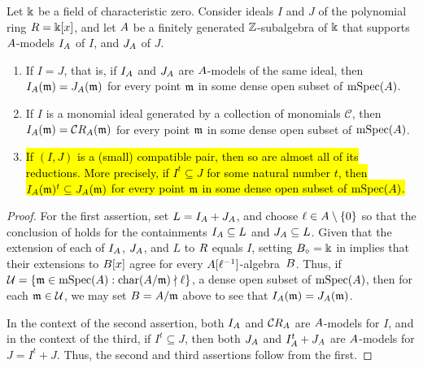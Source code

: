 \documentclass{amsart}
\begin{document}
\begin{corollary}
\label{reduction basics: C}
Let $\Bbbk$ be a field of characteristic zero.  Consider ideals  $I$ and $J$ of the polynomial ring $R = \Bbbk[x]$, and let $A$ be a finitely generated $\mathbb{Z}$-subalgebra of $\Bbbk$ that supports $A$-models $I_A$ of $I$, and $J_A$ of $J$.   

\begin{enumerate}[$(1)$]
\item \label{different models of same ideal}
If $I=J$, that is, if $I_A$ and $J_A$ are $A$-models of the same ideal, then $I_A(\mathfrak{m}) = J_A(\mathfrak{m})$ for every point $\mathfrak{m}$ in some dense open subset of $\operatorname{mSpec}(A)$.
\item \label{reduction preserves being monomial} If $I$ is a monomial ideal generated by a collection of monomials $\mathcal{C}$, then $I_A(\mathfrak{m}) = \mathcal{C} R_A(\mathfrak{m})$ for every point $\mathfrak{m}$ in some dense open subset of $\operatorname{mSpec}(A)$.
\item \label{reduction preserves compatibility} \hl{If $(I,J)$ is a \textup(small\textup) compatible pair, then so are almost all of its reductions.  More precisely, if $I^t \subseteq J$ for some natural number $t$, then $I_A(\mathfrak{m})^t \subseteq J_A(\mathfrak{m})$ for every point $\mathfrak{m}$ in some dense open subset of $\operatorname{mSpec}(A)$.}
\end{enumerate}
\end{corollary}

\begin{proof}
   For the first assertion, set $L=I_A + J_A$, and choose $\ell \in A \setminus \{0\}$ so that the conclusion of  holds for the containments $I_A \subseteq L$ and $J_A \subseteq L$.
   Given that the extension of each of $I_A$, $J_A$, and $L$ to $R$ equals $I$, setting $B_{\circ} = \Bbbk$ in  implies that their extensions to $B[x]$ agree for every $A[\ell^{-1}]$-algebra~$B$.
   Thus, if $\mathcal{U} = \{ \mathfrak{m} \in \operatorname{mSpec}(A) : \operatorname{char}(A/\mathfrak{m}) \nmid \ell \}$,  a dense open subset of $\operatorname{mSpec}(A)$, 
 then for each $\mathfrak{m} \in \mathcal{U}$, we may set $B=A/\mathfrak{m}$ above to see that $I_A(\mathfrak{m}) = J_A(\mathfrak{m})$.

 In the context of the second assertion, both $I_A$ and $\mathcal{C}R_A$ are $A$-models for $I$, and in the context of the third, if $I^t \subseteq J$, then both $J_A$ and $I_A^t +J_A$ are $A$-models for $J=I^t + J$.
 Thus, the second and third assertions follow from the first. 
\end{proof}
\end{document}
